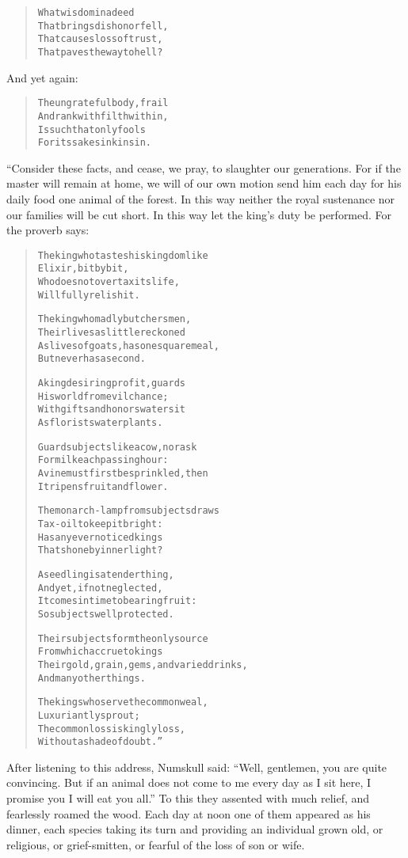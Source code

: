 \documentclass[article, twoside, 14pt]{memoir}
\renewenvironment{verbatim}{%
\begin{quote}%
\vskip -10pt%
\begin{alltt}\normalfont\large}{\end{alltt}%
\end{quote}%
\vskip -10pt
} %
\begin{document}
\begin{verbatim}
What wisdom in a deed
    That brings dishonor fell,
That causes loss of trust,
    That paves the way to hell?
\end{verbatim}
And yet again:

\begin{verbatim}
The ungrateful body, frail
    And rank with filth within,
Is such that only fools
    For its sake sink in sin.
\end{verbatim}
“Consider these facts, and cease, we pray, to slaughter our
generations. For if the master will remain at home, we will of our
own motion send him each day for his daily food one animal of the
forest. In this way neither the royal sustenance nor our families
will be cut short. In this way let the king's duty be performed.
For the proverb says:

\begin{verbatim}
The king who tastes his kingdom like
    Elixir, bit by bit,
Who does not overtax its life,
Will fully relish it.

The king who madly butchers men,
    Their lives as little reckoned
As lives of goats, has one square meal,
    But never has a second.

A king desiring profit, guards
    His world from evil chance;
With gifts and honors waters it
    As florists water plants.

Guard subjects like a cow, nor ask
    For milk each passing hour:
A vine must first be sprinkled, then
    It ripens fruit and flower.

The monarch-lamp from subjects draws
    Tax-oil to keep it bright:
Has any ever noticed kings
    That shone by inner light?

A seedling is a tender thing,
    And yet, if not neglected,
It comes in time to bearing fruit:
    So subjects well protected.

Their subjects form the only source
    From which accrue to kings
Their gold, grain, gems, and varied drinks,
    And many other things.

The kings who serve the common weal,
    Luxuriantly sprout;
The common loss is kingly loss,
    Without a shade of doubt.”
\end{verbatim}
After listening to this address, Numskull said:
``Well, gentlemen, you are quite convincing. But if an animal does not come to me every day as I sit here, I promise you I will eat you all.''
To this they assented with much relief, and fearlessly roamed the
wood. Each day at noon one of them appeared as his dinner, each
species taking its turn and providing an individual grown old, or
religious, or grief-smitten, or fearful of the loss of son or
wife.
\end{document}
